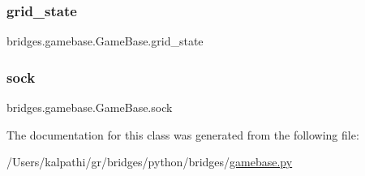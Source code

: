 \subsubsection{\texorpdfstring{grid\_state}{grid\_state}}
{\footnotesize\ttfamily bridges.\+gamebase.\+Game\+Base.\+grid\+\_\+state}

\mbox{\label{classbridges_1_1gamebase_1_1_game_base_a4a7fe2d524c02966900937bddea195e7}} 
\subsubsection{\texorpdfstring{sock}{sock}}
{\footnotesize\ttfamily bridges.\+gamebase.\+Game\+Base.\+sock}



The documentation for this class was generated from the following file\+:\begin{DoxyCompactItemize}
\item 
/\+Users/kalpathi/gr/bridges/python/bridges/\mbox{\hyperlink{gamebase_8py}{gamebase.\+py}}\end{DoxyCompactItemize}

